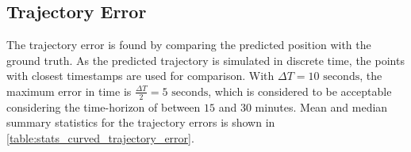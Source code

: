 \subsection{Trajectory Error}
The trajectory error is found by comparing the predicted position with the ground truth. As the predicted trajectory is simulated in discrete time, the points with closest timestamps are used for comparison. With $\Delta T = 10\text{ seconds}$, the maximum error in time is $\frac{\Delta T}{2} = 5 \text{ seconds}$, which is considered to be acceptable considering the time-horizon of between $15$ and $30$ minutes. Mean and median summary statistics for the trajectory errors is shown in \cref{table:stats_curved_trajectory_error}.
\begin{table}[h]
    \begin{subtable}{\textwidth}
        \caption{Mean Error}
    \end{subtable}
    \begin{subtable}{\textwidth}
\end{subtable}
\end{table}
